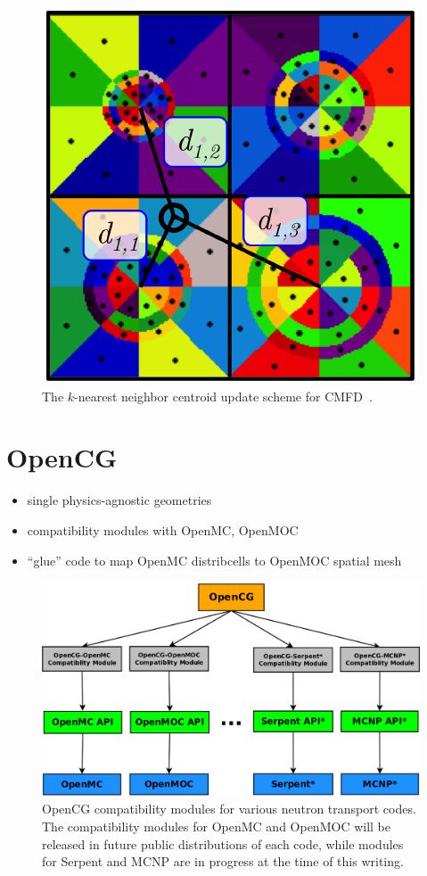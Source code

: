 \begin{figure}
  \centering
  \includegraphics[width=0.5\linewidth]{figures/workflow/openmoc/centroid}
\caption[$k$-nearest neighbor centroid scheme for CMFD]{The $k$-nearest neighbor centroid update scheme for \ac{CMFD}~\cite{shaner2015cmfd}.}
\label{fig:knn-cmfd}
\end{figure}


\section{OpenCG}
\label{sec:chap4-opencg}

\begin{itemize}[noitemsep]
  \item single physics-agnostic geometries~\cite{boyd2015opencg}
  \item compatibility modules with OpenMC, OpenMOC
  \item ``glue'' code to map OpenMC distribcells to OpenMOC spatial mesh
\end{itemize}

\begin{figure}[h!]
  \centering
  \includegraphics[width=.8\linewidth]{figures/workflow/opencg/compatibility-modules}
  \caption{OpenCG compatibility modules for various neutron transport codes. The compatibility modules for OpenMC and OpenMOC will be released in future public distributions of each code, while modules for Serpent and MCNP are in progress at the time of this writing.}
  \label{fig:compatibility-modules}
\end{figure}


